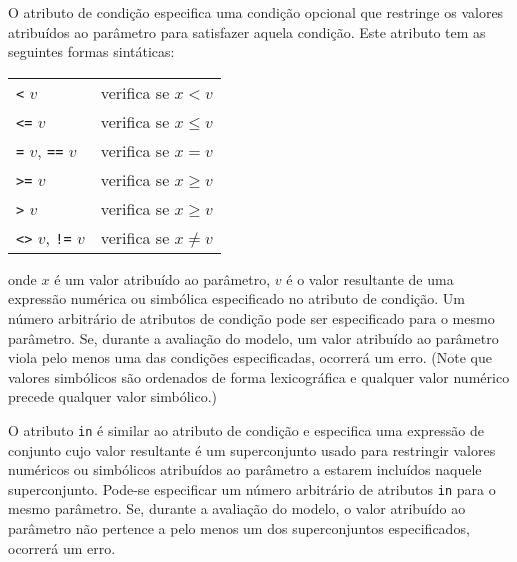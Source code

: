 \documentclass[11pt, brazil]{report}
\begin{document}
O atributo de condição especifica uma condição opcional que restringe
os valores atribuídos ao parâmetro para satisfazer aquela condição.
Este atributo tem as seguintes formas sintáticas:

%

\begin{tabular}{@{}ll@{}}
{\tt<} $v$&verifica se $x<v$\\
{\tt<=} $v$&verifica se $x\leq v$\\
{\tt=} $v$, {\tt==} $v$&verifica se $x=v$\\
{\tt>=} $v$&verifica se $x\geq v$\\
{\tt>} $v$&verifica se $x\geq v$\\
{\tt<>} $v$, {\tt!=} $v$&verifica se $x\neq v$\\
\end{tabular}


\noindent onde $x$ é um valor atribuído ao parâmetro, $v$ é o
valor resultante de uma expressão numérica ou simbólica especificado
no atributo de condição. Um número arbitrário de atributos de condição
pode ser especificado para o mesmo parâmetro. Se, durante a avaliação do
modelo, um valor atribuído ao parâmetro viola pelo menos uma das
condições especificadas, ocorrerá um erro. (Note que valores simbólicos
são ordenados de forma lexicográfica e qualquer valor numérico precede
qualquer valor simbólico.)

O atributo {\tt in} é similar ao atributo de condição e especifica
uma expressão de conjunto cujo valor resultante é um superconjunto usado
para restringir valores numéricos ou simbólicos atribuídos ao parâmetro
a estarem incluídos naquele superconjunto. Pode-se especificar um número
arbitrário de atributos {\tt in} para o mesmo parâmetro. Se, durante a avaliação do
modelo, o valor atribuído ao parâmetro não pertence a pelo menos um dos
superconjuntos especificados, ocorrerá um erro.
\end{document}

